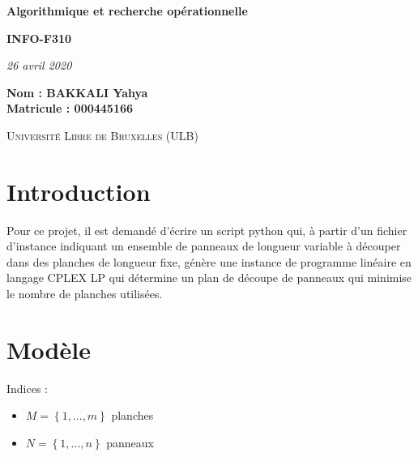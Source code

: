 \documentclass{article}[A4]
\begin{document}
\begin{titlepage}
    \begin{center}
        \vspace*{1cm}


        \Huge
        \textbf{Algorithmique et recherche opérationnelle}
        \vspace{0.25cm}

        \LARGE
        \textbf{INFO-F310}

        \vspace{0.25cm}
        \LARGE

        \vspace{0.25cm}
		\textit{26 avril 2020}

        \vspace{3cm}
       	\Large
        \textbf{Nom : BAKKALI Yahya \\}
        \textbf{Matricule : 000445166 \\}


        \vspace{2cm}

        \textsc{Université Libre de Bruxelles (ULB)}


    \end{center}
\end{titlepage}

\setcounter{tocdepth}{3}
\renewcommand{\contentsname}{Table des matières}
\tableofcontents
\newpage
\large

\section{Introduction}
Pour ce projet, il est demandé d'écrire un script python qui, à partir
d'un fichier d'instance indiquant un ensemble de panneaux de longueur
variable à découper dans des planches de longueur fixe, génère une 
instance de programme linéaire en langage CPLEX LP qui détermine un 
plan de découpe de panneaux qui minimise le nombre de planches 
utilisées.
\section{Modèle}
Indices :
\begin{itemize}
    \item[] $M = \left\{1, ..., m\right\}$ planches
    \item[] $N = \left\{1, ..., n\right\}$ panneaux
\end{itemize}
\end{document}
